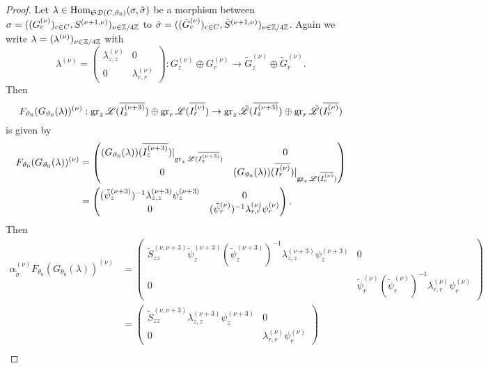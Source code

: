 \begin{proof}
Let $\lambda \in \operatorname{Hom}_{\mathfrak{SD}(C,\vartheta_0)}(\sigma, \tilde{\sigma})$ be a morphism between $\sigma=((G_c^{(\nu)})_{c \in C}, S^{(\nu+1,\nu)})_{\nu \in \mathbb{Z}/4\mathbb{Z}}$ to $\tilde{\sigma}=((\tilde{G}_c^{(\nu)})_{c \in C}, \tilde{S}^{(\nu+1,\nu)})_{\nu \in \mathbb{Z}/4\mathbb{Z}}$. Again we write $\lambda=(\lambda^{(\nu)})_{\nu \in \mathbb{Z}/4\mathbb{Z}}$ with \[\lambda^{(\nu)} = \begin{pmatrix}
    \lambda_{z,z}^{(\nu)} & 0 \\ 
    0 & \lambda_{r,r}^{(\nu)}
\end{pmatrix}: G_z^{(\nu)} \oplus G_r^{(\nu)} \to \tilde{G}_z^{(\nu)} \oplus \tilde{G}_r^{(\nu)}.\] Then
\[
F_{\vartheta_0}(G_{\vartheta_0}(\lambda))^{(\nu)}: \operatorname{gr}_z\mathscr{L}(\overline{I_z^{(\nu+3)}}) \oplus \operatorname{gr}_r\mathscr{L}(\overline{I_r^{(\nu)}})\to \operatorname{gr}_z\tilde{\mathscr{L}}(\overline{I_z^{(\nu+3)}}) \oplus \operatorname{gr}_r\tilde{\mathscr{L}}(\overline{I_r^{(\nu)}})
\]
is given by
\begin{align*}
F_{\vartheta_0}(G_{\vartheta_0}(\lambda))^{(\nu)} & = \begin{pmatrix}
    (G_{\vartheta_0}(\lambda))(\overline{I_z^{(\nu+3)}})\vert_{\operatorname{gr}_z\mathscr{L}(\overline{I_z^{(\nu+3)}})} & 0 \\ 
    0 & (G_{\vartheta_0}(\lambda))(\overline{I_r^{(\nu)}})\vert_{\operatorname{gr}_r\mathscr{L}(\overline{I_r^{(\nu)}})}
\end{pmatrix} \\ & = \begin{pmatrix}
    (\tilde{\psi}_z^{(\nu+3)})^{-1}\lambda_{z,z}^{(\nu+3)}\psi_z^{(\nu+3)} & 0 \\
    0 & (\tilde{\psi}_r^{(\nu)})^{-1}\lambda_{r,r}^{(\nu)}\psi_r^{(\nu)}
\end{pmatrix}. 
\end{align*}
Then 
\begin{align*}
\alpha_{\tilde{\sigma}}^{(\nu)}F_{\theta_0}(G_{\theta_0}(\lambda))^{(\nu)} & = 
\begin{pmatrix}
\tilde{S}_{zz}^{(\nu,\nu+3)}\tilde{\psi}_z^{(\nu+3)}(\tilde{\psi}_z^{(\nu+3)})^{-1}\lambda_{z,z}^{(\nu+3)}\psi_z^{(\nu+3)} & 0 \\
    0 & \tilde{\psi}_r^{(\nu)}(\tilde{\psi}_r^{(\nu)})^{-1}\lambda_{r,r}^{(\nu)}\psi_r^{(\nu)}
\end{pmatrix} 
\\
& =  
\begin{pmatrix}
    \tilde{S}_{zz}^{(\nu,\nu+3)}\lambda_{z,z}^{(\nu+3)}\psi_z^{(\nu+3)} & 0 \\
    0 & \lambda_{r,r}^{(\nu)}\psi_r^{(\nu)}
\end{pmatrix} \\

\end{align*}
\end{proof}
